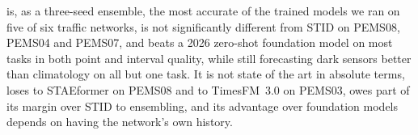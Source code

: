 is, as a three-seed ensemble, the most accurate of the trained models we ran on five of six traffic networks, is
not significantly different from STID on PEMS08, PEMS04 and PEMS07, and beats a 2026 zero-shot foundation model on most tasks in both
point and interval quality, while still forecasting dark sensors better than climatology on all but one task. It is
not state of the art in absolute terms, loses to STAEformer on PEMS08 and to TimesFM~3.0 on PEMS03, owes part of its
margin over STID to ensembling, and its advantage over foundation models depends on having the network's own history.
